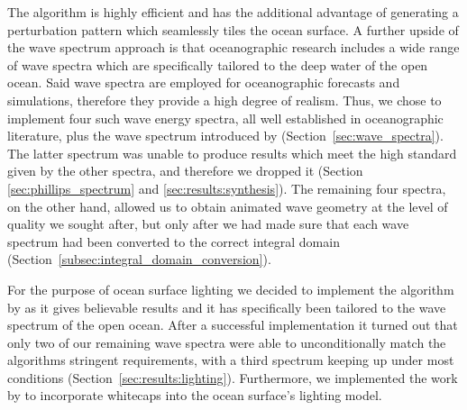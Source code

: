 The \FFT algorithm is highly efficient and has the additional advantage
of generating a perturbation pattern which seamlessly tiles the ocean surface.
A further upside of the wave spectrum approach is that oceanographic
research includes a wide range of wave spectra which are specifically
tailored to the deep water of the open ocean. Said wave spectra are
employed for oceanographic forecasts and simulations, therefore they
provide a high degree of realism.
Thus, we chose to implement four such wave energy spectra,
all well established in oceanographic literature, plus the wave
spectrum introduced by \citeauthor{course:simulatingocean} (Section~\ref{sec:wave_spectra}).
The latter spectrum was unable to produce results which meet the high
standard given by the other spectra, and therefore we dropped it
(Section \ref{sec:phillips_spectrum} and \ref{sec:results:synthesis}).
The remaining four spectra, on the other hand, allowed us to obtain
animated wave geometry at the level of quality we sought after,
but only after we had made sure that each wave spectrum had been converted
to the correct integral domain (Section~\ref{subsec:integral_domain_conversion}).
%

For the purpose of ocean surface lighting we decided to implement the
algorithm by \citet{misc:oceanlightingfft} as it gives believable results
and it has specifically been tailored to the wave spectrum of the open ocean.
After a successful implementation it turned out that only two of our
remaining wave spectra were able to unconditionally match the algorithms
stringent requirements, with a third spectrum keeping up under most
conditions (Section~\ref{sec:results:lighting}).
Furthermore, we implemented the work by \citet{article:whitecaps} to
incorporate whitecaps into the ocean surface's lighting model.

